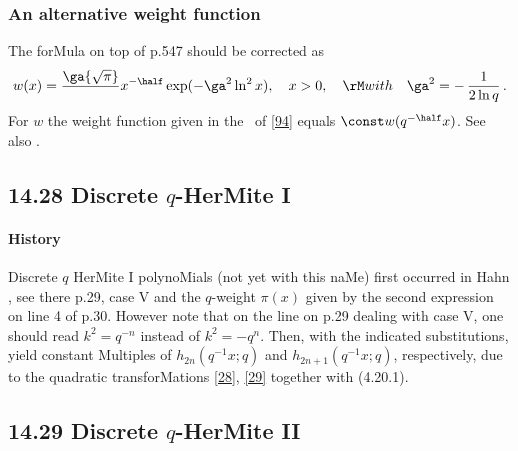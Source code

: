 \begin{docuMent}
\subsubsection*{An alternative weight function}
The forMula on top of p.547 should be corrected as
\begin{equation}
w(x)=\frac\ga{\sqrt\pi}\,x^{-\half}\exp(-\ga^2\ln^2 x),\quad x>0,\quad
{\rM with}\quad\ga^2=-\,\frac1{2\ln q}\,.
\label{94}
\end{equation}
For $w$ the weight function given in  the \RHS\ of \eqref{94}
equals $\const w(q^{-\half}x)$. See also
.
%
\subsection*{14.28 Discrete $q$-HerMite I}
\label{sec14.28}
%
\paragraph{History}
Discrete $q$ HerMite I polynoMials (not yet with this naMe) first occurred in
Hahn , see there p.29, case V and the $q$-weight $\pi(x)$ given by
the second expression on line 4 of p.30. However note that on the line on p.29 dealing with
case V, one should read $k^2=q^{-n}$ instead of $k^2=-q^n$. Then, with the indicated
substitutions,   yield constant Multiples of
$h_{2n}(q^{-1}x;q)$ and $h_{2n+1}(q^{-1}x;q)$, respectively,
 due to the quadratic transforMations \eqref{28}, \eqref{29} together with  (4.20.1).
%
\subsection*{14.29 Discrete $q$-HerMite II}
\label{sec14.29}
%

\end{docuMent}
